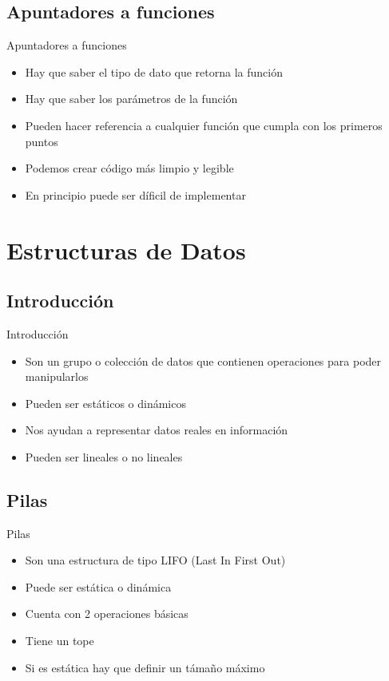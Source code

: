 \documentclass{beamer}
\begin{document}
\subsection{Apuntadores a funciones}

\begin{frame}{Apuntadores a funciones}
	\begin{itemize}
		\item Hay que saber el tipo de dato que retorna la funci\'on
		\item Hay que saber los par\'ametros de la funci\'on
		\item Pueden hacer referencia a cualquier funci\'on que cumpla con los primeros puntos
		\item Podemos crear c\'odigo m\'as limpio y legible
		\item En principio puede ser d\'ificil de implementar
	\end{itemize}
\end{frame}

\section{Estructuras de Datos}

\subsection{Introducci\'on}
\begin{frame}{Introducci\'on}
	\begin{itemize}
		\item Son un grupo o colecci\'on de datos que contienen operaciones para poder manipularlos
		\item Pueden ser est\'aticos o din\'amicos
		\item Nos ayudan a representar datos reales en informaci\'on
		\item Pueden ser lineales o no lineales
	\end{itemize}
\end{frame}

\subsection{Pilas}
\begin{frame}{Pilas}
	\begin{itemize}
		\item Son una estructura de tipo LIFO (Last In First Out)
		\item Puede ser est\'atica o din\'amica
		\item Cuenta con 2 operaciones b\'asicas
		\item Tiene un tope
		\item Si es est\'atica hay que definir un t\'amaño m\'aximo
	\end{itemize}
\end{frame}
\end{document}
